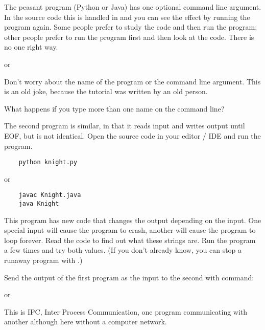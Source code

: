 The peasant program (Python or Java) has one optional command line argument.
In the source code this is handled in  and you can see the effect
by running the program again. Some people prefer to study the code and then run the
program; other people prefer to run the program first and then look at the code.
There is no one right way.

or

\begin{IMPORTANT}
Don't worry about the name of the program or the command line argument. This is an
old joke, because the tutorial was written by an old person.
\end{IMPORTANT}

What happens if you type more than one name on the command line?



The second program is similar, in that it reads input and writes output until EOF,
but is not identical. Open the source code in your editor / IDE and run the program.

\begin{CODE}\begin{verbatim}
    python knight.py
\end{verbatim}\end{CODE}
or
\begin{CODE}\begin{verbatim}
    javac Knight.java
    java Knight
\end{verbatim}\end{CODE}

This program has new  code that changes the output depending
on the input. One special input will cause the program to crash, another will
cause the program to loop forever. Read the code to find out what these strings
are. Run the program a few times and try both values. (If you don't already know,
you can stop a runaway program with .)



Send the output of the first program as the input to the second with command:

or

This is IPC, Inter Process Communication, one program communicating with another
although here without a computer network.

